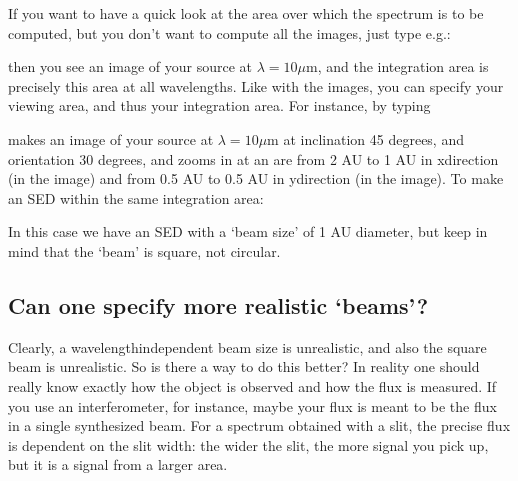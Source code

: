 \documentclass[letterpaper,10pt,english]{sphinxmanual}
\begin{document}
If you want to have a quick look at the area over which the spectrum is to be
computed, but you don’t want to compute all the images, just type e.g.:

\begin{sphinxVerbatim}[commandchars=\\\{\}]
       
\end{sphinxVerbatim}

then you see an image of your source at \(\lambda=10\mu\)m, and the
integration area is precisely this area \sphinxhyphen{} at all wavelengths. Like with the
images, you can specify your viewing area, and thus your integration area. For
instance, by typing

\begin{sphinxVerbatim}[commandchars=\\\{\}]
            
\end{sphinxVerbatim}

makes an image of your source at \(\lambda=10\mu\)m at inclination 45
degrees, and orientation 30 degrees, and zooms in at an are from \sphinxhyphen{}2 AU to \sphinxhyphen{}1 AU
in x\sphinxhyphen{}direction (in the image) and from \sphinxhyphen{}0.5 AU to 0.5 AU in y\sphinxhyphen{}direction (in the
image). To make an SED within the same integration area:

\begin{sphinxVerbatim}[commandchars=\\\{\}]
          
\end{sphinxVerbatim}

In this case we have an SED with a ‘beam size’ of 1 AU diameter, but keep in
mind that the ‘beam’ is square, not circular.


\subsection{Can one specify more realistic ‘beams’?}
\label{\detokenize{imagesspectra:can-one-specify-more-realistic-beams}}\label{\detokenize{imagesspectra:sec-aperture}}
Clearly, a wavelength\sphinxhyphen{}independent beam size is unrealistic, and also the square
beam is unrealistic. So is there a way to do this better? In reality one should
really know exactly how the object is observed and how the flux is measured. If
you use an interferometer, for instance, maybe your flux is meant to be the flux
in a single synthesized beam.  For a spectrum obtained with a slit, the precise
flux is dependent on the slit width: the wider the slit, the more signal you
pick up, but it is a signal from a larger area.
\end{document}
